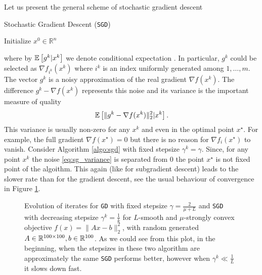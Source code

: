 Let us present the general scheme of stochastic gradient descent
\begin{algorithm}
    \caption{Stochastic Gradient Descent (\texttt{SGD})}
    \label{algo:sgd}
    \begin{algorithmic}
        \STATE Initialize $x^0\in\mathbb{R}^n$
        \ENDFOR
    \end{algorithmic}
\end{algorithm}
where by $\mathbb{E}\left[g^k|x^k\right]$ we denote conditional expectation \cite[Chapter IV, Section $4$]{kolmogorov1933grundbegriffe}.
In particular, $g^k$ could be selected as $\nabla f_{i^k}(x^k)$ where $i^k$ is an index uniformly generated among $1,\ldots, m$. The vector $g^k$ is a noisy approximation of the real gradient $\nabla f(x^k)$. The difference $g^k- \nabla f(x^k)$ represents this noise and its variance is the important measure of quality
\begin{equation}\label{eq:sg_variance}
    \mathbb{E}\left[\|g^k - \nabla f(x^k)\|_2^2|x^k\right].
\end{equation}
This variance is usually non-zero for any $x^k$ and even in the optimal point $x^\star$. For example, the full gradient $\nabla f(x^\star) = 0$ but there is no reason for $\nabla f_i(x^\star)$ to vanish. {Consider Algorithm \ref{algo:sgd} with fixed stepsize $\gamma^k = \gamma$. Since, for any point $x^k$ the noise \eqref{eq:sg_variance} is separated from $0$ the point $x^\star$ is not fixed point of the algoithm.} This again (like for subgradient descent) leads to the slower rate than for the gradient descent, see the usual behaviour of convergence in Figure \ref{fig:sgd_vs_gd}.

\begin{figure}[h]
    \centering
    
    \caption{Evolution of iterates for \texttt{GD} with fixed stepsize $\gamma = \frac{2}{\mu + L}$ and \texttt{SGD} with decreasing stepsize $\gamma^k = \frac{1}{k}$ for $L$-smooth and $\mu$-strongly convex objective $f(x) = \|Ax-b\|_2^2$, with random generated $A\in\mathbb{R}^{100\times100},b\in\mathbb{R}^{100}$. As we could see from this plot, in the beginning, when the stepsizes in these two algorithm are approximately the same \texttt{SGD} performs better, however when $\gamma^k\ll \frac{1}{L}$ it slows down fast.}
    \label{fig:sgd_vs_gd}
\end{figure}

